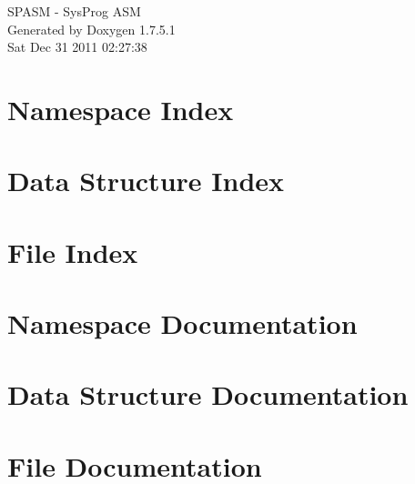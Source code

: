 \documentclass[a4paper]{book}
\begin{document}
\hypersetup{pageanchor=false,citecolor=blue}
\begin{titlepage}
\vspace*{7cm}
\begin{center}
{\Large \-S\-P\-A\-S\-M -\/ \-Sys\-Prog \-A\-S\-M }\\
\vspace*{1cm}
{\large \-Generated by Doxygen 1.7.5.1}\\
\vspace*{0.5cm}
{\small Sat Dec 31 2011 02:27:38}\\
\end{center}
\end{titlepage}
\clearemptydoublepage
{}
\tableofcontents
\clearemptydoublepage
{}
\hypersetup{pageanchor=true,citecolor=blue}
\chapter{\-Namespace \-Index}

\chapter{\-Data \-Structure \-Index}

\chapter{\-File \-Index}

\chapter{\-Namespace \-Documentation}


\chapter{\-Data \-Structure \-Documentation}






\chapter{\-File \-Documentation}













\printindex
\end{document}
